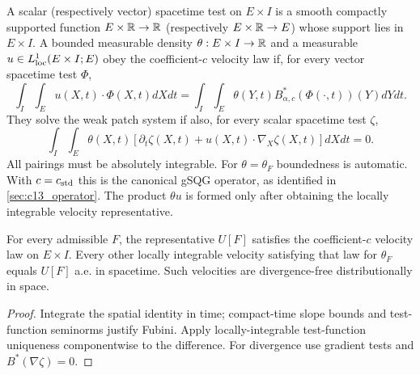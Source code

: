 \begin{definition}
  \label{def:c13_weak_patch_system}
  A scalar (respectively vector) spacetime test on $E\times I$ is a smooth compactly supported function
  $E\times\mathbb{R}\to\mathbb{R}$ (respectively $E\times\mathbb{R}\to E$) whose support lies in $E\times I$.
  A bounded measurable density $\theta:E\times I\to\mathbb{R}$ and a measurable
  $u\in L^1_{\rm loc}(E\times I;E)$ obey the coefficient-$c$ velocity law if, for every
  vector spacetime test $\Phi$,
  \[
    \int_I\!\int_E u(X,t)\cdot\Phi(X,t)dXdt
      =\int_I\!\int_E\theta(Y,t)B^*_{\alpha,c}(\Phi(\cdot,t))(Y)dYdt.
  \]
  They solve the weak patch system if also, for every scalar spacetime test $\zeta$,
  \[
    \int_I\!\int_E\theta(X,t)
       [\partial_t\zeta(X,t)+u(X,t)\cdot\nabla_X\zeta(X,t)]dXdt=0.
  \]
  All pairings must be absolutely integrable. For $\theta=\theta_F$ boundedness is automatic.
  With $c=c_{\rm std}$ this is the canonical gSQG operator, as identified in \cref{sec:c13_operator}.
  The product $\theta u$ is formed only after obtaining the locally integrable velocity representative.
\end{definition}

\begin{lemma}
  \label{lem:c13_velocity_law_unique}
  For every admissible $F$, the representative $U[F]$ satisfies the coefficient-$c$ velocity law
  on $E\times I$. Every other locally integrable velocity satisfying that law for $\theta_F$
  equals $U[F]$ a.e. in spacetime. Such velocities are divergence-free distributionally in space.
\end{lemma}
\begin{proof}
  Integrate the spatial identity in time; compact-time slope bounds and test-function seminorms
  justify Fubini. Apply locally-integrable test-function uniqueness componentwise to the difference.
  For divergence use gradient tests and $B^*(\nabla\zeta)=0$.
\end{proof}

